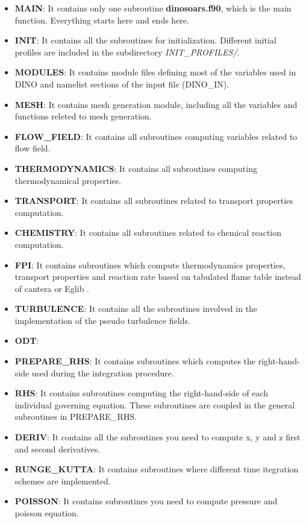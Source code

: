\begin{itemize}
  \item \textbf{MAIN}: It contains only one subroutine \textbf{dinosoars.f90}, which is the main function. Everything starts here and ends here.
  \item \textbf{INIT}: It contains all the subroutines for initialization. Different initial profiles are included in the subdirectory \textit{INIT\_PROFILES/}.
  \item \textbf{MODULES}: It contains module files defining most of the variables used in DINO and namelist sections of the input file (DINO\_IN).
  \item \textbf{MESH}: It contains mesh generation module, including all the variables and functions releted to mesh generation.
  \item \textbf{FLOW\_FIELD}: It contains all subroutines computing variables related to flow field.
  \item \textbf{THERMODYNAMICS}: It contains all subroutines computing thermodynamical properties.
  \item \textbf{TRANSPORT}: It contains all subroutines related to transport properties computation.
  \item \textbf{CHEMISTRY}: It contains all subroutines related to chemical reaction computation.
  \item \textbf{FPI}: It contains subroutines which compute thermodynamics properties, transport properties and reaction rate based on tabulated flame table instead of cantera or Eglib \cite{ern_1994,ern_1995}.
  \item \textbf{TURBULENCE}: It contains all the subroutines involved in the implementation of the pseudo turbulence fields.
  \item \textbf{ODT}:
  \item \textbf{PREPARE\_RHS}: It contains subroutines which computes the right-hand-side used during the integration procedure.
  \item \textbf{RHS}: It contains subroutines computing the right-hand-side of each individual governing equation. These subroutines are coupled in the general subroutines in PREPARE\_RHS.
  \item \textbf{DERIV}: It contains all the subroutines you need to compute x, y and z first and second derivatives.
  \item \textbf{RUNGE\_KUTTA}: It contains subroutines where different time itegration schemes are implemented.
  \item \textbf{POISSON}: It contains subroutines you need to compute pressure and poisson equation.

\end{itemize}
